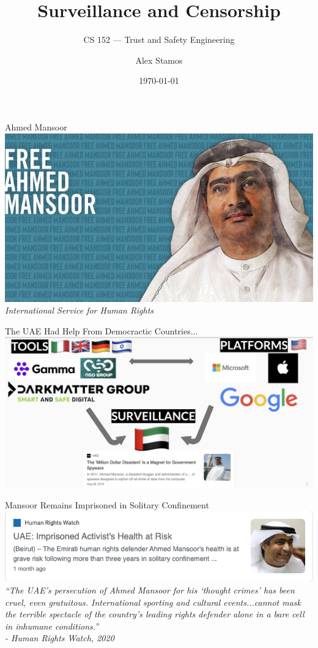 \documentclass[nobackground,dvipsnames,table]{beamer}
\title{Surveillance and Censorship}
\subtitle{CS 152 --- Trust and Safety Engineering}
\author[A. Stamos]{Alex Stamos}
\institute[Stanford University]{Stanford Cyber Policy Center}
\date[2022]{\today}
\begin{document}
\begin{frame}
    \titlepage
\end{frame}

\begin{frame}{Ahmed Mansoor}
    \includegraphics[width=\textwidth]{free-ahmed-mansoor}
    \textit{International Service for Human Rights}
\end{frame}

\begin{frame}{The UAE Had Help From Democractic Countries...}
    \includegraphics[width=\textwidth]{uae-help}
\end{frame}

\begin{frame}{Mansoor Remains Imprisoned in Solitary Confinement}
    \centering
    \includegraphics[width=\textwidth]{mansoor-health-at-risk}
    \textit{“The UAE’s persecution of Ahmed Mansoor for his ‘thought crimes’ has been cruel, even gratuitous. International sporting and cultural events...cannot mask the terrible spectacle of the country’s leading rights defender alone in a bare cell in inhumane conditions.”}\\
    \small{\textit{- Human Rights Watch, 2020}}
\end{frame}
\end{document}
